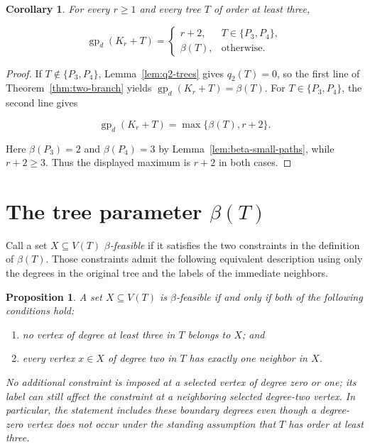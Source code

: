 \documentclass[11pt,a4paper]{article}
\providecommand{\tightlist}{%
  \setlength{\itemsep}{0pt}\setlength{\parskip}{0pt}}
\newtheorem{corollary}[theorem]{Corollary}
\newtheorem{proposition}[theorem]{Proposition}
\numberwithin{equation}{section}
\begin{document}
\begin{corollary}\label{cor:main-formula}
For every \(r\ge 1\) and every tree \(T\) of
order at least three,

\[
\operatorname{gp}_d(K_r+T)=
\begin{cases}
r+2,&T\in\{P_3,P_4\},\\
\beta(T),&\text{otherwise}.
\end{cases}
\]
\end{corollary}

\begin{proof}
If \(T\notin\{P_3,P_4\}\), Lemma~\ref{lem:q2-trees} gives \(q_2(T)=0\),
so the first line of Theorem~\ref{thm:two-branch} yields
\(\operatorname{gp}_d(K_r+T)=\beta(T)\). For \(T\in\{P_3,P_4\}\), the
second line gives

\[
\operatorname{gp}_d(K_r+T)=\max\{\beta(T),r+2\}.
\]

Here \(\beta(P_3)=2\) and \(\beta(P_4)=3\) by Lemma~\ref{lem:beta-small-paths}, while
\(r+2\ge 3\). Thus the displayed maximum is \(r+2\) in both cases.
\end{proof}

\section{The tree parameter \texorpdfstring{$\beta(T)$}{beta(T)}}\label{sec:beta}

Call a set \(X\subseteq V(T)\) \emph{\(\beta\)-feasible} if it satisfies
the two constraints in the definition of \(\beta(T)\). Those constraints
admit the following equivalent description using only the degrees in the
original tree and the labels of the immediate neighbors.

\begin{proposition}\label{prop:local-characterization}
A set \(X\subseteq V(T)\) is
\(\beta\)-feasible if and only if both of the following conditions hold:

\begin{enumerate}
\def\labelenumi{\arabic{enumi}.}
\tightlist
\item
  no vertex of degree at least three in \(T\) belongs to \(X\); and
\item
  every vertex \(x\in X\) of degree two in \(T\) has exactly one
  neighbor in \(X\).
\end{enumerate}

No additional constraint is imposed at a selected vertex of degree zero
or one; its label can still affect the constraint at a neighboring
selected degree-two vertex.
In particular, the statement includes these boundary degrees even though
a degree-zero vertex does not occur under the standing assumption that
\(T\) has order at least three.
\end{proposition}
\end{document}
